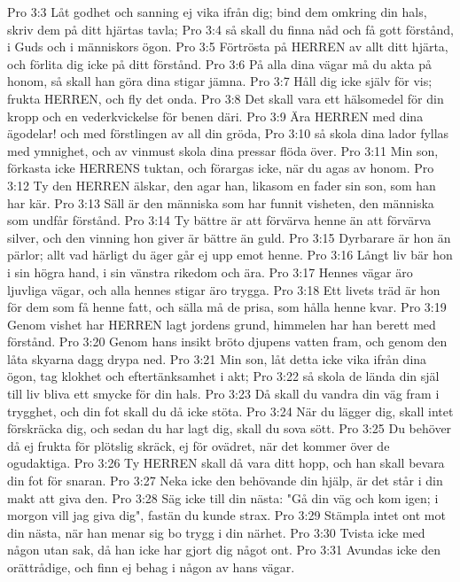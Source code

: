 Pro 3:3  Låt godhet och sanning ej vika ifrån dig; bind dem omkring din hals, skriv dem på ditt hjärtas tavla;
Pro 3:4  så skall du finna nåd och få gott förstånd, i Guds och i människors ögon.
Pro 3:5  Förtrösta på HERREN av allt ditt hjärta, och förlita dig icke på ditt förstånd.
Pro 3:6  På alla dina vägar må du akta på honom, så skall han göra dina stigar jämna.
Pro 3:7  Håll dig icke själv för vis; frukta HERREN, och fly det onda.
Pro 3:8  Det skall vara ett hälsomedel för din kropp och en vederkvickelse för benen däri.
Pro 3:9  Ära HERREN med dina ägodelar! och med förstlingen av all din gröda,
Pro 3:10  så skola dina lador fyllas med ymnighet, och av vinmust skola dina pressar flöda över.
Pro 3:11  Min son, förkasta icke HERRENS tuktan, och förargas icke, när du agas av honom.
Pro 3:12  Ty den HERREN älskar, den agar han, likasom en fader sin son, som han har kär.
Pro 3:13  Säll är den människa som har funnit visheten, den människa som undfår förstånd.
Pro 3:14  Ty bättre är att förvärva henne än att förvärva silver, och den vinning hon giver är bättre än guld.
Pro 3:15  Dyrbarare är hon än pärlor; allt vad härligt du äger går ej upp emot henne.
Pro 3:16  Långt liv bär hon i sin högra hand, i sin vänstra rikedom och ära.
Pro 3:17  Hennes vägar äro ljuvliga vägar, och alla hennes stigar äro trygga.
Pro 3:18  Ett livets träd är hon för dem som få henne fatt, och sälla må de prisa, som hålla henne kvar.
Pro 3:19  Genom vishet har HERREN lagt jordens grund, himmelen har han berett med förstånd.
Pro 3:20  Genom hans insikt bröto djupens vatten fram, och genom den låta skyarna dagg drypa ned.
Pro 3:21  Min son, låt detta icke vika ifrån dina ögon, tag klokhet och eftertänksamhet i akt;
Pro 3:22  så skola de lända din själ till liv bliva ett smycke för din hals.
Pro 3:23  Då skall du vandra din väg fram i trygghet, och din fot skall du då icke stöta.
Pro 3:24  När du lägger dig, skall intet förskräcka dig, och sedan du har lagt dig, skall du sova sött.
Pro 3:25  Du behöver då ej frukta för plötslig skräck, ej för ovädret, när det kommer över de ogudaktiga.
Pro 3:26  Ty HERREN skall då vara ditt hopp, och han skall bevara din fot för snaran.
Pro 3:27  Neka icke den behövande din hjälp, är det står i din makt att giva den.
Pro 3:28  Säg icke till din nästa: "Gå din väg och kom igen; i morgon vill jag giva dig", fastän du kunde strax.
Pro 3:29  Stämpla intet ont mot din nästa, när han menar sig bo trygg i din närhet.
Pro 3:30  Tvista icke med någon utan sak, då han icke har gjort dig något ont.
Pro 3:31  Avundas icke den orättrådige, och finn ej behag i någon av hans vägar.
